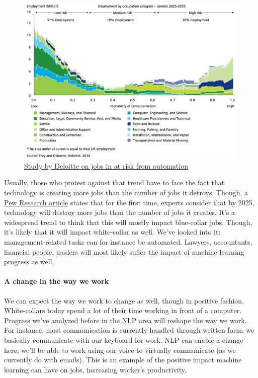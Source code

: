 \documentclass[12pt]{article}
\begin{document}
\smallskip

\begin{figure}[h]
    \centering
    \includegraphics[scale=0.6]{jobs}
    \caption{\href{http://www2.deloitte.com/content/dam/Deloitte/uk/Documents/uk-futures/london-futures-agiletown.pdf}
    {Study by Deloitte on jobs in at risk from automation}}
    \label{fig:deloitte}
\end{figure}

\smallskip

Usually, those who protest against that trend have to face the fact that
technology is creating more jobs than the number of jobs it detroys. Though, a
\href{http://www.pewinternet.org/2014/08/06/future-of-jobs/}{Pew Research article}
states that for the first time, experts consider that by 2025, technology will
destroy more jobs than the number of jobs it creates. It's a widespread trend to
think that this will mostly impact blue-collar jobs. Though, it's likely that it
will impact white-collar as well. We've looked into it: management-related tasks
can for instance be automated. Lawyers, accountants, financial people, traders will
most likely suffer the impact of machine learning progress as well.



\paragraph{A change in the way we work}

We can expect the way we work to change as well, though in positive fashion.
White-collars today spend a lot of their time working in front of a computer.
Progress we've analyzed before in the NLP area will reshape the way we work. For
instance, most communication is currently handled through written form, we
basically communicate with our keyboard for work. NLP can enable a change here,
we'll be able to work using our voice to virtually communicate (as we currently
do with emails). This is an example of the positive impact machine learning can
have on jobs, increasing worker's productivity.
\end{document}

